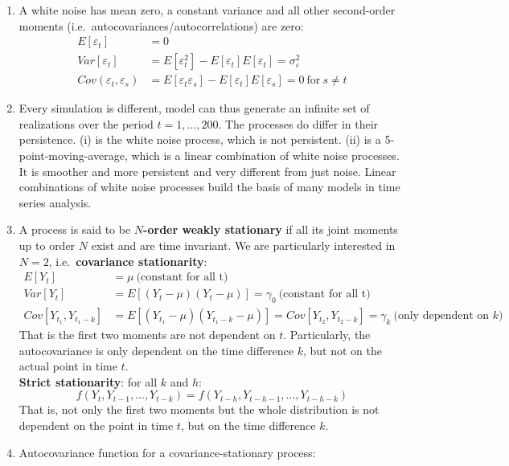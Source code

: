 \begin{enumerate}
\item A white noise has mean zero, a constant variance and all other second-order moments (i.e.\ autocovariances/autocorrelations) are zero:
\begin{align*}
    E[\varepsilon_t]&=0\\
    Var[\varepsilon_t]&=E[\varepsilon_t^2] - E[\varepsilon_t]E[\varepsilon_t] = \sigma_\varepsilon^2\\
    Cov(\varepsilon_{t},\varepsilon_s) &= E[\varepsilon_t \varepsilon_s] - E[\varepsilon_t]E[\varepsilon_s] = 0~\text{for}~s \neq t
\end{align*}	
\item 
Every simulation is different, model can thus generate an infinite set of realizations over the period \(t=1,\ldots ,200\).
The processes do differ in their persistence.
(i) is the white noise process, which is not persistent.
(ii) is a 5-point-moving-average, which is a linear combination of white noise processes.
It is smoother and more persistent and very different from just noise.
Linear combinations of white noise processes build the basis of many models in time series analysis.
\item A process is said to be \textbf{\(N\)-order weakly stationary} if all its joint moments up to order \(N\) exist and are time invariant.
We are particularly interested in \(N=2\), i.e.\ \textbf{covariance stationarity}:
\begin{align*}
E[Y_t]&=\mu~\text{(constant for all t)}
\\
Var[Y_t]&=E[(Y_t - \mu)(Y_t-\mu)]=\gamma_0~\text{(constant for all t)}
\\
Cov[Y_{t_1},Y_{t_1-k}] &= E[(Y_{t_1}-\mu)(Y_{t_1-k}-\mu)] = Cov[Y_{t_2},Y_{t_2-k}] = \gamma_k~\text{(only dependent on \(k\))}
\end{align*}
That is the first two moments are not dependent on \(t\).
Particularly, the autocovariance is only dependent on the time difference \(k\), but not on the actual point in time \(t\).
\\
\textbf{Strict stationarity}: for all \(k\) and \(h\):
\[f(Y_t,Y_{t-1},\ldots ,Y_{t-k})=f(Y_{t-h},Y_{t-h-1},\ldots ,Y_{t-h-k})\]
That is, not only the first two moments but the whole distribution is not dependent on the point in time \(t\),
  but on the time difference \(k\).
\item Autocovariance function for a covariance-stationary process:

\end{enumerate}
